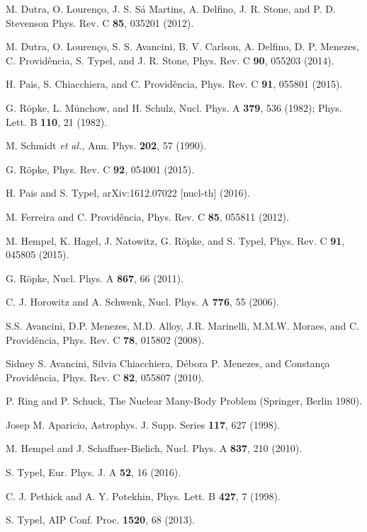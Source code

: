\documentclass[aps,prc,nofootinbib,twocolumn,showpacs]{revtex4-1}
\begin{document}
\begin{thebibliography}{99}
 M. Dutra, O. Lourenço, J. S. Sá Martins, A. Delfino, J. R. Stone, and P. D. Stevenson
Phys. Rev. C {\bf 85}, 035201 (2012).

 M. Dutra, O. Lourenço, S. S. Avancini, B. V. Carlson, A. Delfino, D. P. Menezes, C. Providência, S. Typel, and J. R. Stone, Phys. Rev. C {\bf 90}, 055203 (2014).
 
 H. Pais, S. Chiacchiera, and C. Provid\^encia, Phys. Rev. C {\bf 91}, 055801 (2015).

 G. R\"opke, L. M\"unchow, and H. Schulz, Nucl. Phys. A {\bf 379}, 536 (1982); Phys. Lett. B {\bf 110}, 21 (1982).

 M. Schmidt \textit{et al.}, Ann. Phys. {\bf 202}, 57 (1990).

 G. R\"opke, Phys. Rev. C {\bf 92}, 054001 (2015).  

 H. Pais and S. Typel,  	arXiv:1612.07022 [nucl-th] (2016).

 M. Ferreira and C. Provid\^encia, Phys. Rev. C {\bf 85}, 055811 (2012).

 M. Hempel, K. Hagel, J. Natowitz, G.  R\"opke, and S. Typel, Phys. Rev. C {\bf 91}, 045805 (2015). 


 G. R\"opke, Nucl. Phys. A {\bf 867}, 66 (2011).

 C. J. Horowitz and A. Schwenk,  Nucl. Phys. A {\bf 776}, 55 (2006).

 S.S. Avancini, D.P. Menezes, M.D. Alloy, J.R. Marinelli, M.M.W. Moraes, and C. Provid\^encia,  Phys. Rev. C {\bf 78}, 015802 (2008).

 Sidney S. Avancini, Silvia Chiacchiera, Débora P. Menezes, and Constança Provid\^encia, Phys. Rev. C {\bf 82}, 055807 (2010).

 P. Ring and P. Schuck, The Nuclear Many-Body Problem (Springer, Berlin 1980). 

 Josep M. Aparicio, Astrophys. J. Supp. Series {\bf 117}, 627 (1998).

 M. Hempel and J. Schaffner-Bielich, Nucl. Phys. A {\bf 837}, 210 (2010).

 S. Typel, Eur. Phys. J. A {\bf 52}, 16 (2016).

 C. J. Pethick and A. Y. Potekhin,  Phys. Lett. B  {\bf 427}, 7 (1998).

 S. Typel, AIP Conf. Proc. {\bf 1520}, 68 (2013).


\end{thebibliography}
\end{document}
